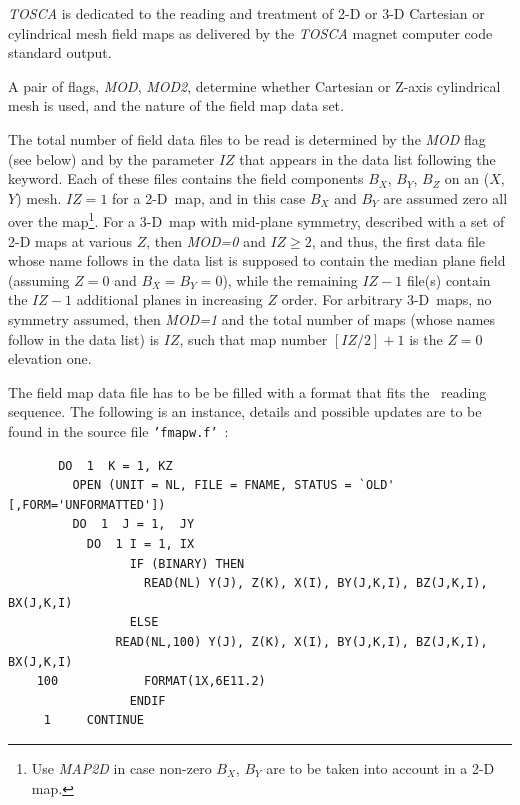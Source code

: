  \textsl{TOSCA} is dedicated to the reading and treatment of 2-D or 
3-D Cartesian or cylindrical mesh field maps as  delivered by the
\textsl{TOSCA}  magnet computer code standard output.

\medskip

\noindent A pair of flags, \textsl{MOD}, \textsl{MOD2}, determine whether Cartesian or Z-axis cylindrical mesh is used, 
and the nature of the field map data set.

\medskip

\noindent The total number of field data files to be read is determined by the \textsl{MOD} flag 
(see below) and by the parameter $IZ$ that appears in the data list following the keyword. 
Each of these files contains the field components $B_X$, $B_Y$, $B_Z$ on an 
\mbox{($X$, $Y$)} mesh. $IZ = 1$ for a 2-D~map, and 
in this case $B_X$ and $B_Y$ are assumed  zero all over the map\footnote{Use 
\textsl{MAP2D} in case non-zero $B_X$, $B_Y$ are to be taken into account in a 2-D map.}. 
For a 3-D~map with mid-plane symmetry, described with a set of 2-D maps at various $Z$, 
then  \textsl{MOD=0} and  $IZ\ge 2$, and thus, the first 
data file whose name follows in the data list is supposed to contain the median 
plane field (assuming $ Z=0 $ and  $ B_X=B_Y=0$), while the remaining  $IZ-1$ 
file(s) contain the $IZ-1$ additional  planes in increasing $Z$ order. For arbitrary 3-D~maps, 
 no  symmetry assumed, then  \textsl{MOD=1} and  
 the total number of maps (whose names follow in the data list) 
is $IZ$, such that  map number $[IZ/2]+1$ is the $Z = 0$ elevation one.

\medskip

\noindent The field map data file has to be be filled with a 
format that fits the  \FORTRAN\ reading sequence. 
The following is an instance, details and possible updates are to be found in the source  
file \texttt{'fmapw.f'}~:  

{\footnotesize
\begin{verbatim}
	   DO  1  K = 1, KZ
	     OPEN (UNIT = NL, FILE = FNAME, STATUS = `OLD' [,FORM='UNFORMATTED'])
	     DO  1  J = 1,  JY  
	       DO  1 I = 1, IX
                 IF (BINARY) THEN
                   READ(NL) Y(J), Z(K), X(I), BY(J,K,I), BZ(J,K,I), BX(J,K,I)
                 ELSE
	           READ(NL,100) Y(J), Z(K), X(I), BY(J,K,I), BZ(J,K,I), BX(J,K,I)
    100	           FORMAT(1X,6E11.2)
                 ENDIF
     1     CONTINUE
\end{verbatim}}
\medskip

